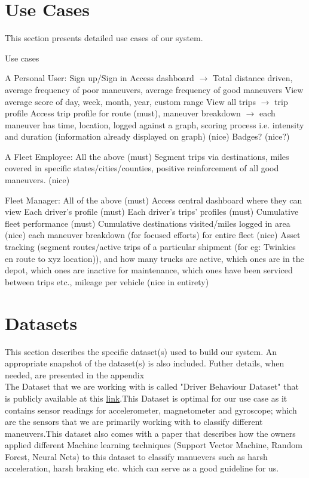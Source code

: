 \section{Use Cases}
This section presents detailed use cases of our system.

Use cases
\begin{outline}
\1 A Personal User:
\2 Sign up/Sign in
\2 Access dashboard $\rightarrow$ Total distance driven, average frequency of poor maneuvers, average frequency of good maneuvers
\2 View average score of day, week, month, year, custom range
\2 View all trips $\rightarrow$ trip profile
\2 Access trip profile for route (must), maneuver breakdown $\rightarrow$ each maneuver has time, location, logged against a graph, scoring process i.e. intensity and duration (information already displayed on graph) (nice)
\2 Badges? (nice?)

\1 A Fleet Employee:
\2 All the above (must)
\2 Segment trips via destinations, miles covered in specific states/cities/counties, positive reinforcement of all good maneuvers. (nice)

\1 Fleet Manager:
\2 All of the above (must)
\2 Access central dashboard where they can view 
\3 Each driver's profile (must)
\3 Each driver's trips' profiles (must)
\3 Cumulative fleet performance (must)
\3 Cumulative destinations visited/miles logged in area (nice)
\3 each maneuver breakdown (for focused efforts) for entire fleet (nice)
\2 Asset tracking (segment routes/active trips of a particular shipment (for eg: Twinkies en route to xyz location)), and how many trucks are active, which ones are in the depot, which ones are inactive for maintenance, which ones have been serviced between trips etc., mileage per vehicle (nice in entirety)
\end{outline}

\section{Datasets}
This section describes the specific dataset(s) used to build our system. An appropriate snapshot of the dataset(s) is also included. Futher details, when needed, are presented in the appendix\\

The Dataset that we are working with is called "Driver Behaviour Dataset" that is publicly available at this \textcolor{blue}{\href{https://github.com/jair-jr/driverBehaviorDataset}{link}}.This Dataset is optimal for our use case as it contains sensor readings for accelerometer, magnetometer and gyroscope; which are the sensors that we are primarily working with to classify different maneuvers.This dataset also comes with a paper that describes how the owners applied different Machine learning techniques (Support Vector Machine, Random Forest, Neural Nets) to this dataset to classify manuevers such as harsh acceleration, harsh braking etc. which can serve as a good guideline for us.

